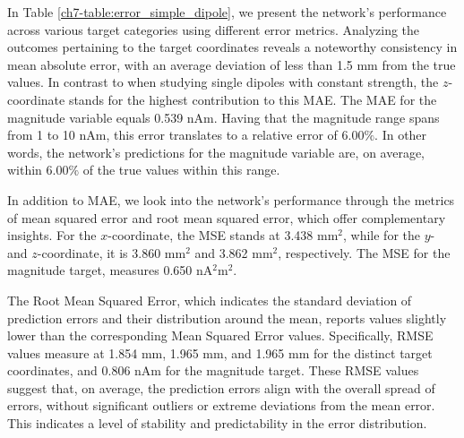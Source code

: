 \documentclass[a4paper, UKenglish, 11pt]{uiomaster}
\begin{document}


In Table \ref{ch7-table:error_simple_dipole}, we present the network's performance across various target categories using different error metrics. Analyzing the outcomes pertaining to the target coordinates reveals a noteworthy consistency in mean absolute error, with an average deviation of less than 1.5 mm from the true values. In contrast to when studying single dipoles with constant strength, the $z$-coordinate stands for the highest contribution to this MAE. The MAE for the magnitude variable equals 0.539 nAm. Having that the magnitude range spans from 1 to 10 nAm, this error translates to a relative error of 6.00$\%$. In other words, the network's predictions for the magnitude variable are, on average, within 6.00$\%$ of the true values within this range.

In addition to MAE, we look into the network's performance through the metrics of mean squared error and root mean squared error, which offer complementary insights. For the $x$-coordinate, the MSE stands at 3.438 mm$^2$, while for the $y$- and $z$-coordinate, it is 3.860 mm$^2$ and 3.862 mm$^2$, respectively. The MSE for the magnitude target, measures 0.650 nA$^2$m$^2$.

The Root Mean Squared Error, which indicates the standard deviation of prediction errors and their distribution around the mean, reports values slightly lower than the corresponding Mean Squared Error values. Specifically, RMSE values measure at 1.854 mm, 1.965 mm, and 1.965 mm for the distinct target coordinates, and 0.806 nAm for the magnitude target. These RMSE values suggest that, on average, the prediction errors align with the overall spread of errors, without significant outliers or extreme deviations from the mean error. This indicates a level of stability and predictability in the error distribution.
\end{document}

